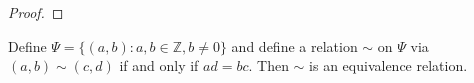 \documentclass[12pt]{article}
\newenvironment{theorem}[2][Theorem]{\begin{trivlist}
\item[\hskip \labelsep {\bfseries #1}\hskip \labelsep {\bfseries #2.}]}{\end{trivlist}}
\begin{document}
\begin{proof}

\end{proof}
\begin{theorem}{6} 
	Define $\Psi = \{(a,b): a,b \in \mathbb{Z}, b\neq 0\}$ and define a relation $\sim$ on $\Psi$ via $(a,b) \sim (c,d)$ if and only if
	$ad=bc$. Then $\sim$ is an equivalence relation.\\
\end{theorem}
\end{document}
